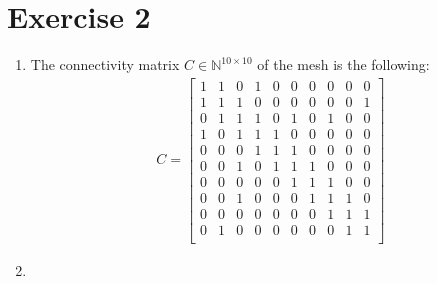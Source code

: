 \documentclass{article}
\begin{document}
\section{Exercise 2}
\begin{enumerate}[label=(\alph*)]

    \item The connectivity matrix $C\in\mathbb N^{10\times 10}$ of the mesh is the following:
    \begin{align*}
        C=\left[\begin{matrix}
            1 & 1 & 0 & 1 & 0 & 0 & 0 & 0 & 0 & 0\\
            1 & 1 & 1 & 0 & 0 & 0 & 0 & 0 & 0 & 1\\
            0 & 1 & 1 & 1 & 0 & 1 & 0 & 1 & 0 & 0\\
            1 & 0 & 1 & 1 & 1 & 0 & 0 & 0 & 0 & 0\\
            0 & 0 & 0 & 1 & 1 & 1 & 0 & 0 & 0 & 0\\
            0 & 0 & 1 & 0 & 1 & 1 & 1 & 0 & 0 & 0\\
            0 & 0 & 0 & 0 & 0 & 1 & 1 & 1 & 0 & 0\\
            0 & 0 & 1 & 0 & 0 & 0 & 1 & 1 & 1 & 0\\
            0 & 0 & 0 & 0 & 0 & 0 & 0 & 1 & 1 & 1\\
            0 & 1 & 0 & 0 & 0 & 0 & 0 & 0 & 1 & 1\\
        \end{matrix}\right]
    \end{align*}
    \item 
    

\end{enumerate}
\end{document}
